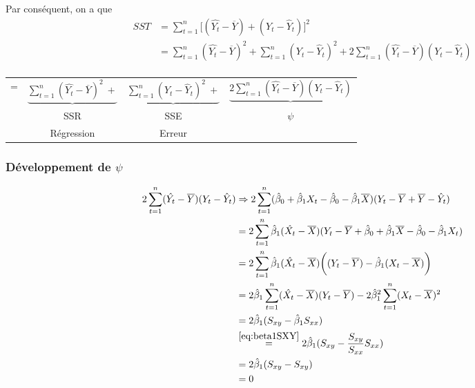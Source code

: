 \documentclass[11pt,french]{report}
\begin{document}
Par conséquent, on a que
\begin{align*}
SST &= \displaystyle\sum_{t=1}^n \bigg[ (\hat{Y_t} - \overline{Y}) + (Y_t - \hat{Y}_t) \bigg]^2 \\
&= \displaystyle\sum_{t=1}^n (\hat{Y_t} - \overline{Y})^2 + \displaystyle\sum_{t=1}^n(Y_t - \hat{Y}_t)^2 + 2 \displaystyle\sum_{t=1}^n (\hat{Y_t} - \overline{Y})(Y_t - \hat{Y}_t)\\
\end{align*}
\begin{center}
\begin{tabular}{cccc}
 = & $\underbrace{\displaystyle\sum_{t=1}^n (\hat{Y_t} - \overline{Y})^2 \  + }$ & $\underbrace{\displaystyle\sum_{t=1}^n(Y_t - \hat{Y}_t)^2 \  +} $ & $\underbrace{2 \displaystyle\sum_{t=1}^n (\hat{Y_t} - \overline{Y})(Y_t - \hat{Y}_t)}$\\
 & SSR & SSE & $\psi$ \\
 & Régression & Erreur & \\
\end{tabular}
\end{center}

\subsubsection*{Développement de $\psi$}
\begin{align*}
2 \displaystyle\sum_{t=1}^n (\hat{Y_t} - \overline{Y})(Y_t - \hat{Y}_t) &\Rightarrow 2 \displaystyle\sum_{t=1}^n (\hat{\beta}_0 + \hat{\beta}_1X_t - \hat{\beta}_0 - \hat{\beta}_1\overline{X})(Y_t - \overline{Y} + \overline{Y} - \hat{Y}_t) \\
&= 2 \displaystyle\sum_{t=1}^n \hat{\beta}_1 (\hat{X_t} - \overline{X}) (Y_t - \overline{Y} + \hat{\beta}_0 + \hat{\beta}_1\overline{X} - \hat{\beta}_0 - \hat{\beta}_1 X_t) \\
&= 2 \displaystyle\sum_{t=1}^n \hat{\beta}_1 (\hat{X_t} - \overline{X}) \bigg((Y_t - \overline{Y}) - \hat{\beta}_1(X_t - \overline{X}) \bigg)\\
&= 2 \hat{\beta}_1 \displaystyle\sum_{t=1}^n  (\hat{X_t} - \overline{X})(Y_t - \overline{Y}) - 2 \hat{\beta}_1^2 \displaystyle\sum_{t=1}^n (X_t - \overline{X})^2\\
&= 2 \hat{\beta}_1 (S_{xy} - \hat{\beta}_1S_{xx})\\
& \overset{\ref{eq:beta1SXY}}{=} 2 \hat{\beta}_1 (S_{xy} - \frac{S_{xy}}{S_{xx}}S_{xx})\\
&= 2 \hat{\beta}_1 (S_{xy} - S_{xy})\\
&= 0 \\
\end{align*}
\end{document}
